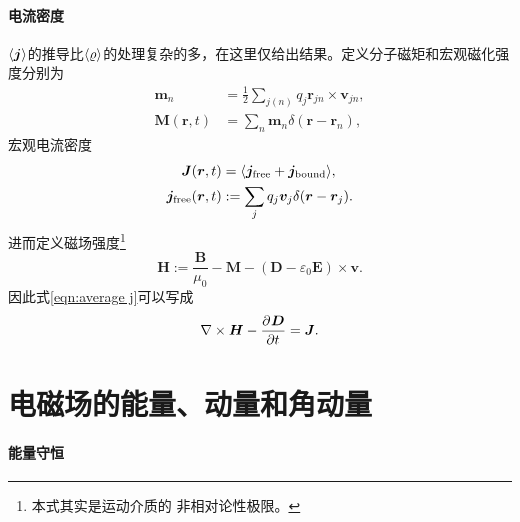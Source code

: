 \paragraph{电流密度}
$\langle\bm j\rangle$的推导比$\langle\varrho\rangle$的处理复杂的多，在这里仅给出结果。定义分子磁矩和宏观磁化强度分别为
\begin{align*}
    \bm m_n &= \frac12\sum_{j(n)}q_j\bm r_{jn} \times \bm v_{jn},\\
    \bm M(\bm r,t) &= \sum_n\bm m_n\delta(\bm r - \bm r_n),
\end{align*}
宏观电流密度
\begin{align*}
    \bm J(\bm r,t) &= \langle\bm j_{\mathrm{free}} + \bm j_{\mathrm{bound}}\rangle,\\
    \bm j_{\mathrm{free}}(\bm r,t) &:= \sum_jq_j\bm v_j\delta(\bm r - \bm r_j).
\end{align*}
进而定义磁场强度\footnote{本式其实是运动介质的%
非相对论性极限。}
\[
    \bm H := \frac{\bm B}{\mu_0} - \bm M - (\bm D - \varepsilon_0\bm E) \times \bm v.
\]
因此式\eqref{eqn:average j}可以写成
\[
    \nabla\times\bm H - \frac{\partial^{}\bm D}{\partial{t}^{}} = \bm J.
\] 

\section{电磁场的能量、动量和角动量}

\paragraph{能量守恒}


